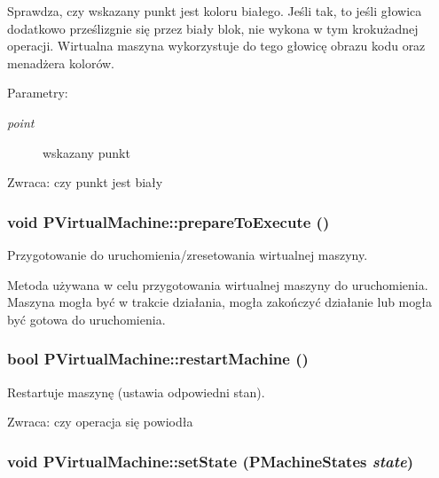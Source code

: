 Sprawdza, czy wskazany punkt jest koloru białego. Jeśli tak, to jeśli głowica dodatkowo prześlizgnie się przez biały blok, nie wykona w tym krokużadnej operacji. Wirtualna maszyna wykorzystuje do tego głowicę obrazu kodu oraz menadżera kolorów. \begin{Desc}
\item[Parametry:]
\begin{description}
\item[{\em point}]wskazany punkt \end{description}
\end{Desc}
\begin{Desc}
\item[Zwraca:]czy punkt jest biały \end{Desc}
\hypertarget{classPVirtualMachine_513af8673f1430cd04fd0a0e46abedd4}{
\subsubsection[{prepareToExecute}]{\setlength{\rightskip}{0pt plus 5cm}void PVirtualMachine::prepareToExecute ()}}
\label{classPVirtualMachine_513af8673f1430cd04fd0a0e46abedd4}


Przygotowanie do uruchomienia/zresetowania wirtualnej maszyny. 

Metoda używana w celu przygotowania wirtualnej maszyny do uruchomienia. Maszyna mogła być w trakcie działania, mogła zakończyć działanie lub mogła być gotowa do uruchomienia. \hypertarget{classPVirtualMachine_f4cdf5d80b7a169e2dfdebffe2588e4b}{
\subsubsection[{restartMachine}]{\setlength{\rightskip}{0pt plus 5cm}bool PVirtualMachine::restartMachine ()}}
\label{classPVirtualMachine_f4cdf5d80b7a169e2dfdebffe2588e4b}


Restartuje maszynę (ustawia odpowiedni stan). \begin{Desc}
\item[Zwraca:]czy operacja się powiodła \end{Desc}
\hypertarget{classPVirtualMachine_bede8c1e068c19b9bc61a957de70cda8}{
\subsubsection[{setState}]{\setlength{\rightskip}{0pt plus 5cm}void PVirtualMachine::setState ({\bf PMachineStates} {\em state})}}
\label{classPVirtualMachine_bede8c1e068c19b9bc61a957de70cda8}


